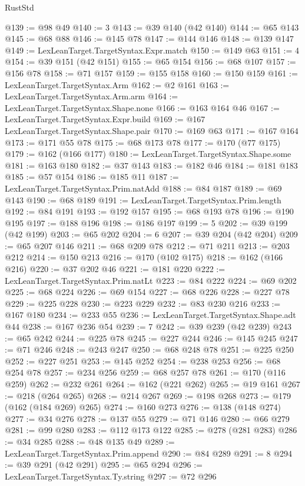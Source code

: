 \begin{lexlean}{RustStd}
\begin{coremodule}
@139 := @98 @49
@140 := 3
@143 := @39 @140 (@42 @140)
@144 := @65 @143
@145 := @68 @88
@146 := @145 @78
@147 := @144 @146
@148 := @139 @147
@149 := LexLeanTarget.TargetSyntax.Expr.match
@150 := @149 @63
@151 := 4
@154 := @39 @151 (@42 @151)
@155 := @65 @154
@156 := @68 @107
@157 := @156 @78
@158 := @71 @157
@159 := @155 @158
@160 := @150 @159
@161 := LexLeanTarget.TargetSyntax.Arm
@162 := @2 @161
@163 := LexLeanTarget.TargetSyntax.Arm.arm
@164 := LexLeanTarget.TargetSyntax.Shape.none
@166 := @163 @164 @46
@167 := LexLeanTarget.TargetSyntax.Expr.build
@169 := @167 LexLeanTarget.TargetSyntax.Shape.pair
@170 := @169 @63
@171 := @167 @164
@173 := @171 @55 @78
@175 := @68 @173 @78
@177 := @170 (@77 @175)
@179 := @162 (@166 @177)
@180 := LexLeanTarget.TargetSyntax.Shape.some
@181 := @163 @180
@182 := @37 @143
@183 := @182 @46
@184 := @181 @183
@185 := @57 @154
@186 := @185 @11
@187 := LexLeanTarget.TargetSyntax.Prim.natAdd
@188 := @84 @187
@189 := @69 @143
@190 := @68 @189
@191 := LexLeanTarget.TargetSyntax.Prim.length
@192 := @84 @191
@193 := @192 @157
@195 := @68 @193 @78
@196 := @190 @195
@197 := @188 @196
@198 := @186 @197
@199 := 5
@202 := @39 @199 (@42 @199)
@203 := @65 @202
@204 := 6
@207 := @39 @204 (@42 @204)
@209 := @65 @207 @146
@211 := @68 @209 @78
@212 := @71 @211
@213 := @203 @212
@214 := @150 @213
@216 := @170 (@102 @175)
@218 := @162 (@166 @216)
@220 := @37 @202 @46
@221 := @181 @220
@222 := LexLeanTarget.TargetSyntax.Prim.natLt
@223 := @84 @222
@224 := @69 @202
@225 := @68 @224
@226 := @69 @154
@227 := @68 @226
@228 := @227 @78
@229 := @225 @228
@230 := @223 @229
@232 := @83 @230 @216
@233 := @167 @180
@234 := @233 @55
@236 := LexLeanTarget.TargetSyntax.Shape.adt @44
@238 := @167 @236 @54
@239 := 7
@242 := @39 @239 (@42 @239)
@243 := @65 @242
@244 := @225 @78
@245 := @227 @244
@246 := @145 @245
@247 := @71 @246
@248 := @243 @247
@250 := @68 @248 @78
@251 := @225 @250
@252 := @227 @251
@253 := @145 @252
@254 := @238 @253
@256 := @68 @254 @78
@257 := @234 @256
@259 := @68 @257 @78
@261 := @170 (@116 @259)
@262 := @232 @261
@264 := @162 (@221 @262)
@265 := @19 @161
@267 := @218 (@264 @265)
@268 := @214 @267
@269 := @198 @268
@273 := @179 (@162 (@184 @269) @265)
@274 := @160 @273
@276 := @138 (@148 @274)
@277 := @34 @276
@278 := @137 @55
@279 := @71 @146
@280 := @66 @279
@281 := @99 @280
@283 := @112 @173 @122
@285 := @278 (@281 @283)
@286 := @34 @285
@288 := @48 @135 @49
@289 := LexLeanTarget.TargetSyntax.Prim.append
@290 := @84 @289
@291 := 8
@294 := @39 @291 (@42 @291)
@295 := @65 @294
@296 := LexLeanTarget.TargetSyntax.Ty.string
@297 := @72 @296

\end{coremodule}
\end{lexlean}
